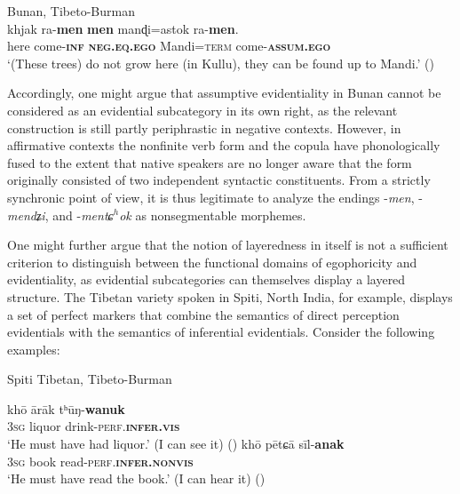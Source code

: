 \documentclass[output=paper]{langsci/langscibook}
\begin{document}
\begin{exe}
	\ex Bunan, Tibeto-Burman\label{ex:mw5}\\
	\gll khjak ra-\textbf{men} \textbf{men} manɖi=astok ra-\textbf{men}.\\
	here	 come-\textbf{\textsc{inf}} \textbf{\textsc{neg}.\textsc{eq}.\textsc{ego}} Mandi=\textsc{term} come-\textbf{\textsc{assum}.\textsc{ego}}\\
	\trans ‘(These trees) do not grow here (in Kullu), they can be found up to Mandi.’ (\citealt[223]{Widmer2017a})
\end{exe}


Accordingly, one might argue that assumptive evidentiality in Bunan cannot be considered as an evidential subcategory in its own right, as the relevant construction is still partly periphrastic in negative contexts. However, in affirmative contexts the nonfinite verb form and the copula have phonologically fused to the extent that native speakers are no longer aware that the form originally consisted of two independent syntactic constituents. From a strictly synchronic point of view, it is thus legitimate to analyze the endings -\textit{men}, -\textit{mendʑi}, and -\textit{mentɕ$^h$ok} as nonsegmentable morphemes.

One might further argue that the notion of layeredness in itself is not a sufficient criterion to distinguish between the functional domains of egophoricity and evidentiality, as evidential subcategories can themselves display a layered structure. The Tibetan variety spoken in Spiti, North India, for example, displays a set of perfect markers that combine the semantics of direct perception evidentials with the semantics of inferential evidentials. Consider the following examples:

\begin{exe}
	\ex Spiti Tibetan, Tibeto-Burman\label{ex:mw6}
	\begin{xlist}
	\ex \label{ex:mw6a}
	\gll khō	 ārāk tʰūŋ-\textbf{wanuk}\\
	3\textsc{sg}	 liquor drink-\textsc{perf}.\textbf{\textsc{infer}.\textsc{vis}}\\
	\trans ‘He must have had liquor.’ (I can see it) (\citealt[46]{Hein2001})
	\ex \label{ex:mw6b}
	\gll khō pētɕā sīl-\textbf{anak}\\
	3\textsc{sg} book read-\textsc{perf}.\textbf{\textsc{infer}.\textsc{nonvis}}\\
	\trans ‘He must have read the book.’ (I can hear it) (\citealt[46]{Hein2001})
	\end{xlist}
\end{exe}
\end{document}
